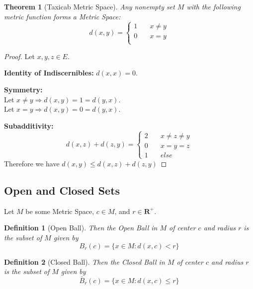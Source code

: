 \documentclass{article}
\newtheorem{definition}{Definition}[section]
\newtheorem{theorem}{Theorem}[section]
\begin{document}
			\begin{theorem}[Taxicab Metric Space]
			\label{taxicab metric space}
				Any nonempty set $M$ with the following metric function forms a Metric Space:
				\begin{equation*}
					d(x, y)=\begin{cases}
							  1 \quad & x \neq y \\
							  0 \quad & x = y \\
						 \end{cases}
					\end{equation*}
				\end{theorem}
				\begin{proof}
					Let $x, y, z \in E$.
					\item \textbf{Identity of Indiscernibles:} $d(x, x) = 0$.
					\item \textbf{Symmetry:} \\
						Let $x \neq y \Rightarrow d(x, y) = 1 = d(y, x)$. \\
						Let $x=y \Rightarrow d(x, y) = 0 = d(y, x)$.
					\item \textbf{Subadditivity:}
						\begin{equation*}
							d(x, z) + d(z, y)=\begin{cases}
									2 \quad & x \neq z \neq y \\
									0 \quad & x = y = z \\
									1 \quad &else
								\end{cases}
						\end{equation*}
						Therefore we have $d(x, y) \leq d(x, z) + d(z, y)$

				\end{proof}
		\subsection{Open and Closed Sets}
			Let $M$ be some Metric Space, $c \in M$, and $r \in \mathbf{R}^+$.
			\begin{definition}[Open Ball]
			\label{open ball}
				Then the Open Ball in $M$ of center $c$ and radius $r$ is the subset of $M$ given by
				$$B_r(c) = \{x \in M: d(x, c) < r \}$$
			\end{definition}
		
			\begin{definition}[Closed Ball]
			\label{closed ball}
				Then the Closed Ball in $M$ of center $c$ and radius $r$ is the subset of $M$ given by
				$$\bar{B}_r(c) = \{x \in M: d(x, c) \leq r \}$$
			\end{definition}
\end{document}
